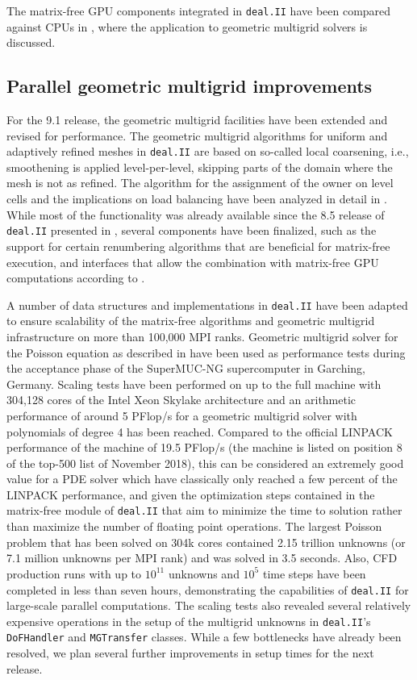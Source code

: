 \documentclass{ansarticle-preprint}
\newcommand{\specialword}[1]{\texttt{#1}}
\newcommand{\dealii}{{\specialword{deal.II}}\xspace}
\begin{document}
The matrix-free GPU components integrated in \dealii have been compared against
CPUs in \cite{KronbichlerLjungkvist2019}, where the application to geometric
multigrid solvers is discussed.

\subsection{Parallel geometric multigrid improvements}
\label{subsec:gmg}

For the 9.1 release, the geometric multigrid facilities have been extended and
revised for performance. The geometric multigrid algorithms for uniform and
adaptively refined meshes in \dealii are based on so-called local coarsening,
i.e., smoothening is applied level-per-level, skipping parts of the domain
where the mesh is not as refined. The algorithm for the assignment of the
owner on level cells and the implications on load balancing have been analyzed
in detail in \cite{ClevengerHeisterKanschatKronbichler2019}. While most of the
functionality was already available since the 8.5 release of \dealii presented
in \cite{dealII85}, several components have been finalized, such as the
support for certain renumbering algorithms that are beneficial for matrix-free
execution, and interfaces that allow the combination with matrix-free GPU
computations according to \cite{KronbichlerLjungkvist2019}.

A number of data structures and implementations in \dealii have been adapted
to ensure scalability of the matrix-free algorithms and geometric multigrid
infrastructure on more than 100,000 MPI ranks. Geometric multigrid solver for
the Poisson equation as described in \cite{KronbichlerWall2018} have been used
as performance tests during the acceptance phase of the SuperMUC-NG
supercomputer in Garching, Germany. Scaling tests have been performed on up to
the full machine with 304,128 cores of the Intel Xeon Skylake architecture and
an arithmetic performance of around 5 PFlop/s for a geometric multigrid solver
with polynomials of degree 4 has been reached. Compared to the official
LINPACK performance of the machine of 19.5 PFlop/s (the machine is listed on
position 8 of the top-500 list of November 2018), this can be considered an
extremely good value for a PDE solver which have classically only reached a
few percent of the LINPACK performance, and given the optimization steps
contained in the matrix-free module of \dealii that aim to minimize the time
to solution rather than maximize the number of floating point operations. The
largest Poisson problem that has been solved on 304k cores contained 2.15
trillion unknowns (or 7.1 million unknowns per MPI rank) and was solved in 3.5
seconds. Also, CFD production runs with up to $10^{11}$ unknowns and $10^5$
time steps have been completed in less than seven hours, demonstrating the
capabilities of \dealii for large-scale parallel computations. The scaling tests
also revealed several relatively expensive operations in the setup of the
multigrid unknowns in \dealii's \texttt{DoFHandler} and \texttt{MGTransfer}
classes. While a few bottlenecks have already been resolved, we plan several
further improvements in setup times for the next release.
\end{document}

